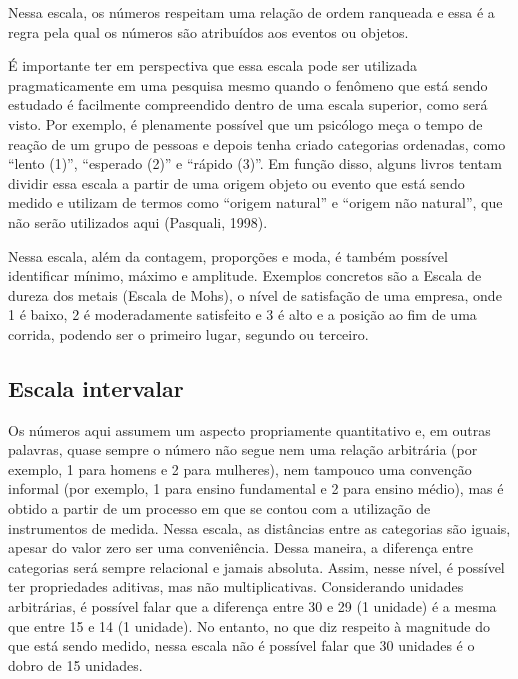 \documentclass[
]{book}
\begin{document}
Nessa escala, os números respeitam uma relação de ordem ranqueada e essa é a regra pela qual os números são atribuídos aos eventos ou objetos.

É importante ter em perspectiva que essa escala pode ser utilizada pragmaticamente em uma pesquisa mesmo quando o fenômeno que está sendo estudado é facilmente compreendido dentro de uma escala superior, como será visto. Por exemplo, é plenamente possível que um psicólogo meça o tempo de reação de um grupo de pessoas e depois tenha criado categorias ordenadas, como ``lento (1)'', ``esperado (2)'' e ``rápido (3)''. Em função disso, alguns livros tentam dividir essa escala a partir de uma origem objeto ou evento que está sendo medido e utilizam de termos como ``origem natural'' e ``origem não natural'', que não serão utilizados aqui (Pasquali, 1998).

Nessa escala, além da contagem, proporções e moda, é também possível identificar mínimo, máximo e amplitude. Exemplos concretos são a Escala de dureza dos metais (Escala de Mohs), o nível de satisfação de uma empresa, onde 1 é baixo, 2 é moderadamente satisfeito e 3 é alto e a posição ao fim de uma corrida, podendo ser o primeiro lugar, segundo ou terceiro.

\hypertarget{escala-intervalar}{%
\subsection{Escala intervalar}\label{escala-intervalar}}

Os números aqui assumem um aspecto propriamente quantitativo e, em outras palavras, quase sempre o número não segue nem uma relação arbitrária (por exemplo, 1 para homens e 2 para mulheres), nem tampouco uma convenção informal (por exemplo, 1 para ensino fundamental e 2 para ensino médio), mas é obtido a partir de um processo em que se contou com a utilização de instrumentos de medida.
Nessa escala, as distâncias entre as categorias são iguais, apesar do valor zero ser uma conveniência. Dessa maneira, a diferença entre categorias será sempre relacional e jamais absoluta. Assim, nesse nível, é possível ter propriedades aditivas, mas não multiplicativas. Considerando unidades arbitrárias, é possível falar que a diferença entre 30 e 29 (1 unidade) é a mesma que entre 15 e 14 (1 unidade). No entanto, no que diz respeito à magnitude do que está sendo medido, nessa escala não é possível falar que 30 unidades é o dobro de 15 unidades.
\end{document}

